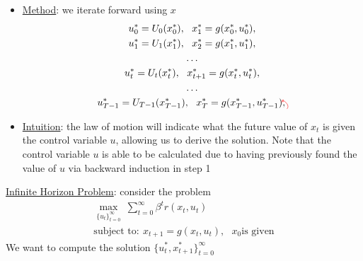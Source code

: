 \documentclass{article}
\newcommand{\tikzmark}[1]{\tikz[overlay,remember picture] \node (#1) {};}
\begin{document}
\begin{itemize}
\begin{itemize}
        \begin{itemize}
            \item \underline{Method}: we iterate forward using $x$
            \begin{gather*}
                u_{0}^{*} = U_{0}(x_{0}^{*}), \ \ \tikzmark{a}x_{1}^{*} = g(x_{0}^{*}, u_{0}^{*}), \\
                u_{1}^{*} = U_{1}(x\tikzmark{b}_{1}^{*}), \ \ x_{2}^{*} = g(x_{1}^{*}, u_{1}^{*}), \\
                \dots \\
                u_{t}^{*} = U_{t}(x_{t}^{*}), \ \ x_{t+1}^{*} = g(x_{t}^{*}, u_{t}^{*}), \\
                \dots \\
                u_{T-1}^{*} = U_{T-1}(x_{T-1}^{*}), \ \ x_{T}^{*} = g(x_{T-1}^{*}, u_{T-1}^{*}),
                \begin{tikzpicture}[overlay,remember picture,-latex,shorten >=0.001pt,shorten <=0.001pt]
                    \draw[->,red, distance=0.25cm] (a.south) to (b.north west);
                \end{tikzpicture}
            \end{gather*}
            \item \underline{Intuition}: the law of motion will indicate what the future value of $x_{t}$ is given the control variable $u$, allowing us to derive the solution. Note that the control variable $u$ is able to be calculated due to having previously found the value of $u$ via backward induction in step 1
        \end{itemize}
    \end{itemize}
\end{itemize}
\vspace{2.5mm}
\par \underline{Infinite Horizon Problem}: consider the problem \begin{gather*}
\max_{\{u_{t}\}_{t=0}^{\infty}} \ \sum_{t=0}^{\infty} \beta^{t}r(x_{t}, u_{t}) \\
\text{subject to}: \ x_{t+1} = g(x_{t}, u_{t}), \ \ \ x_{0} \text{is given}
\end{gather*}
We want to compute the solution $\{u_{t}^{*}, x_{t+1}^{*}\}_{t=0}^{\infty}$
\end{document}

